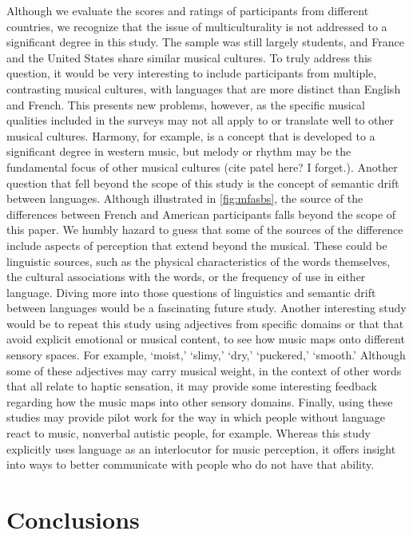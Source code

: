 \documentclass[
  english,
  man,floatsintext]{apa6}
\begin{document}
Although we evaluate the scores and ratings of participants from different countries, we recognize that the issue of multiculturality is not addressed to a significant degree in this study. The sample was still largely students, and France and the United States share similar musical cultures. To truly address this question, it would be very interesting to include participants from multiple, contrasting musical cultures, with languages that are more distinct than English and French. This presents new problems, however, as the specific musical qualities included in the surveys may not all apply to or translate well to other musical cultures. Harmony, for example, is a concept that is developed to a significant degree in western music, but melody or rhythm may be the fundamental focus of other musical cultures (cite patel here? I forget.).
Another question that fell beyond the scope of this study is the concept of semantic drift between languages. Although illustrated in \ref{fig:mfasbs}, the source of the differences between French and American participants falls beyond the scope of this paper. We humbly hazard to guess that some of the sources of the difference include aspects of perception that extend beyond the musical. These could be linguistic sources, such as the physical characteristics of the words themselves, the cultural associations with the words, or the frequency of use in either language. Diving more into those questions of linguistics and semantic drift between languages would be a fascinating future study.
Another interesting study would be to repeat this study using adjectives from specific domains or that that avoid explicit emotional or musical content, to see how music maps onto different sensory spaces. For example, `moist,' `slimy,' `dry,' `puckered,' `smooth.' Although some of these adjectives may carry musical weight, in the context of other words that all relate to haptic sensation, it may provide some interesting feedback regarding how the music maps into other sensory domains.
Finally, using these studies may provide pilot work for the way in which people without language react to music, nonverbal autistic people, for example. Whereas this study explicitly uses language as an interlocutor for music perception, it offers insight into ways to better communicate with people who do not have that ability.

\hypertarget{conclusions}{%
\section{Conclusions}\label{conclusions}}
\end{document}
